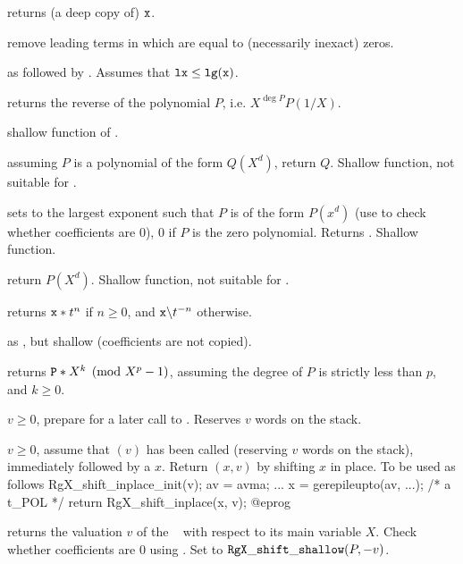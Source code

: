  returns (a deep copy of) ${\tt x}$.

 remove leading terms in  which are
equal to (necessarily inexact) zeros.

 as 
followed by . Assumes that ${\tt lx} \leq
{\tt lg(x)}$.

 returns the reverse of the polynomial
$P$, i.e. $X^{\deg P} P(1/X)$.

 shallow function of .

 assuming $P$ is a polynomial of the
form $Q(X^d)$, return $Q$. Shallow function, not suitable for
.

 sets  to the largest exponent
such that $P$ is of the form $P(x^d)$ (use  to check
whether coefficients are 0), $0$ if $P$ is the zero polynomial. Returns
. Shallow function.

 return $P(X^d)$. Shallow function, not
suitable for .


 returns ${\tt x} * t^n$ if $n\geq 0$,
and $\kbd{x} \bs t^{-n}$ otherwise.

 as , but
shallow (coefficients are not copied).

 returns ${\tt P} * X^k
\pmod {X^p-1}$, assuming the degree of $P$ is strictly less than $p$, and
$k\geq 0$.

 $v \geq 0$, prepare for a later
call to . Reserves $v$ words on the stack.

 $v \geq 0$, assume that
$(v)$ has been called (reserving $v$ words on the
stack), immediately followed by a  $x$. Return $(x,v)$
by shifting $x$ in place. To be used as follows
\bprog
  RgX_shift_inplace_init(v);
  av = avma;
  ...
  x = gerepileupto(av, ...); /* a t_POL */
  return RgX_shift_inplace(x, v);
@eprog

 returns the valuation $v$ of the
~ with respect to its main variable $X$. Check whether
coefficients are $0$ using . Set  to
${\tt RgX\_shift\_shallow}(P,-v)$.


